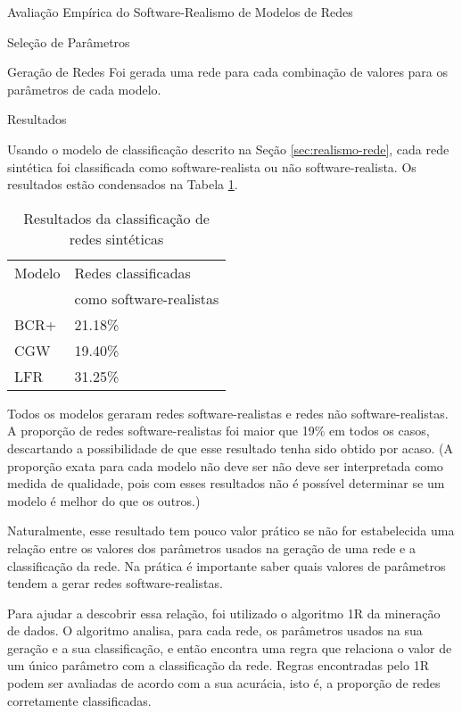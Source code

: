 \begin{section}{Avaliação Empírica do Software-Realismo de Modelos de Redes}
\begin{subsection}{Seleção de Parâmetros}
\end{subsection}

\begin{section}{Geração de Redes}
	Foi gerada uma rede para cada combinação de valores para os parâmetros de cada modelo. %
\end{section}

\begin{subsection}{Resultados}

Usando o modelo de classificação descrito na Seção \ref{sec:realismo-rede}, cada rede sintética foi classificada como software-realista ou não software-realista. Os resultados estão condensados na Tabela \ref{tab:results}.

\begin{table}
\caption{Resultados da classificação de redes sintéticas}
\centering
\begin{tabular}{|l|l|}
\hline
Modelo & Redes classificadas \\ & como software-realistas \\
\hline 
\hline
BCR+ & 21.18\% \\ %
\hline
CGW  & 19.40\% \\  %
\hline
LFR  & 31.25\% \\ %
\hline
\end{tabular}
\label{tab:results}
\end{table}

Todos os modelos geraram redes software-realistas e redes não software-realistas. A proporção de redes software-realistas foi maior que 19\% em todos os casos, descartando a possibilidade de que esse resultado tenha sido obtido por acaso. (A proporção exata para cada modelo não deve ser não deve ser interpretada como medida de qualidade, pois com esses resultados não é possível determinar se um modelo é melhor do que os outros.)

Naturalmente, esse resultado tem pouco valor prático se não for estabelecida uma relação entre os valores dos parâmetros usados na geração de uma rede e a classificação da rede. Na prática é importante saber quais valores de parâmetros tendem a gerar redes software-realistas.

Para ajudar a descobrir essa relação, foi utilizado o algoritmo 1R \cite{OneR} da mineração de dados. O algoritmo analisa, para cada rede, os parâmetros usados na sua geração e a sua classificação, e então encontra uma regra que relaciona o valor de um único parâmetro com a classificação da rede. Regras encontradas pelo 1R podem ser avaliadas de acordo com a sua acurácia, isto é, a proporção de redes corretamente classificadas.


\end{subsection}
\end{section}
